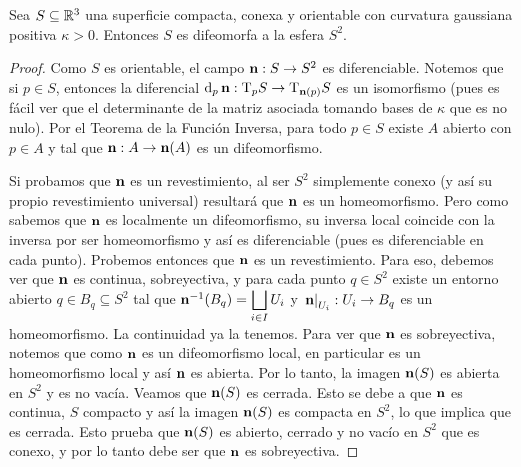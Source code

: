 \begin{teo}[Hadamard]
Sea $S\subseteq\mathbb{R}^3$ una superficie compacta, conexa y orientable con curvatura gaussiana positiva $\kappa>0$. Entonces $S$ es difeomorfa a la esfera $S^2$.
\begin{proof}
Como $S$ es orientable, el campo $\operatorname{\mathbf{n}}:S\to S^2$ es diferenciable. Notemos que si $p\in S$, entonces la diferencial $\mathop{}\!\mathrm{d}_p\operatorname{\mathbf{n}}:\mathrm{T}_pS\to\mathrm{T}_{\operatorname{\mathbf{n}}(p)}S$ es un isomorfismo (pues es fácil ver que el determinante de la matriz asociada tomando bases de $\kappa$ que es no nulo). Por el Teorema de la Función Inversa, para todo $p\in S$ existe $A$ abierto con $p\in A$ y tal que $\operatorname{\mathbf{n}}:A\to\operatorname{\mathbf{n}}(A)$ es un difeomorfismo.

Si probamos que $\operatorname{\mathbf{n}}$ es un revestimiento, al ser $S^2$ simplemente conexo (y así su propio revestimiento universal) resultará que $\operatorname{\mathbf{n}}$ es un homeomorfismo. Pero como sabemos que $\operatorname{\mathbf{n}}$ es localmente un difeomorfismo, su inversa local coincide con la inversa por ser homeomorfismo y así es diferenciable (pues es diferenciable en cada punto). Probemos entonces que $\operatorname{\mathbf{n}}$ es un revestimiento. Para eso, debemos ver que $\operatorname{\mathbf{n}}$ es continua, sobreyectiva, y para cada punto $q\in S^2$ existe un entorno abierto $q\in B_q\subseteq S^2$ tal que $\operatorname{\mathbf{n}}^{-1}(B_q)=\displaystyle\bigsqcup_{i\in I}U_i$ y $\left.\operatorname{\mathbf{n}}\right|_{U_i}:U_i\to B_q$ es un homeomorfismo. La continuidad ya la tenemos. Para ver que $\operatorname{\mathbf{n}}$ es sobreyectiva, notemos que como $\operatorname{\mathbf{n}}$ es un difeomorfismo local, en particular es un homeomorfismo local y así $\operatorname{\mathbf{n}}$ es abierta. Por lo tanto, la imagen $\operatorname{\mathbf{n}}(S)$ es abierta en $S^2$ y es no vacía. Veamos que $\operatorname{\mathbf{n}}(S)$ es cerrada. Esto se debe a que $\operatorname{\mathbf{n}}$ es continua, $S$ compacto y así la imagen $\operatorname{\mathbf{n}}(S)$ es compacta en $S^2$, lo que implica que es cerrada. Esto prueba que $\operatorname{\mathbf{n}}(S)$ es abierto, cerrado y no vacío en $S^2$ que es conexo, y por lo tanto debe ser que $\operatorname{\mathbf{n}}$ es sobreyectiva.


\end{proof}
\end{teo}

